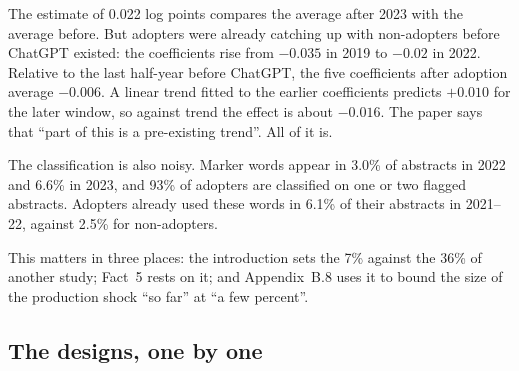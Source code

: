 The estimate of 0.022 log points compares the average after 2023 with the average before. But adopters were already catching up with non-adopters before ChatGPT existed: the coefficients rise from $-0.035$ in 2019 to $-0.02$ in 2022. Relative to the last half-year before ChatGPT, the five coefficients after adoption average $-0.006$. A linear trend fitted to the earlier coefficients predicts $+0.010$ for the later window, so against trend the effect is about $-0.016$. The paper says that ``part of this is a pre-existing trend''. All of it is.

The classification is also noisy. Marker words appear in 3.0\% of abstracts in 2022 and 6.6\% in 2023, and 93\% of adopters are classified on one or two flagged abstracts. Adopters already used these words in 6.1\% of their abstracts in 2021--22, against 2.5\% for non-adopters.

This matters in three places: the introduction sets the 7\% against the 36\% of another study; Fact~5 rests on it; and Appendix~B.8 uses it to bound the size of the production shock ``so far'' at ``a few percent''.

\subsection{The designs, one by one}

